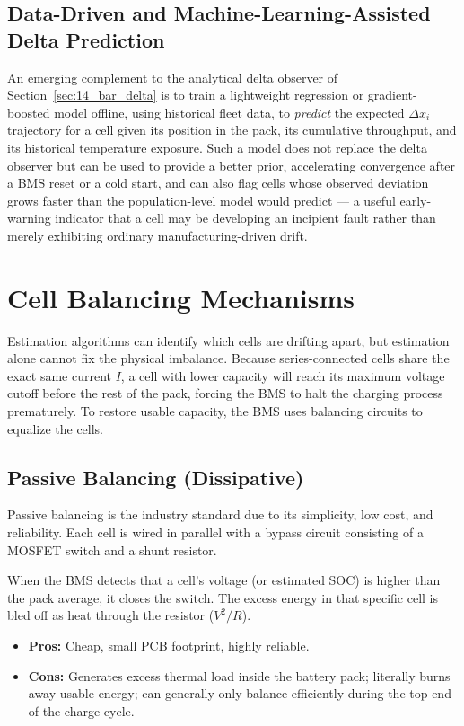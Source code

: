\subsection{Data-Driven and Machine-Learning-Assisted Delta Prediction}
\label{subsec:14_ml_delta}

An emerging complement to the analytical delta observer of Section~\ref{sec:14_bar_delta} is to train a lightweight regression or gradient-boosted model offline, using historical fleet data, to \emph{predict} the expected $\Delta x_i$ trajectory for a cell given its position in the pack, its cumulative throughput, and its historical temperature exposure. Such a model does not replace the delta observer but can be used to provide a better prior, accelerating convergence after a BMS reset or a cold start, and can also flag cells whose observed deviation grows faster than the population-level model would predict — a useful early-warning indicator that a cell may be developing an incipient fault rather than merely exhibiting ordinary manufacturing-driven drift.

\section{Cell Balancing Mechanisms}
\label{sec:14_balancing}

Estimation algorithms can identify which cells are drifting apart, but estimation alone cannot fix the physical imbalance. Because series-connected cells share the exact same current $I$, a cell with lower capacity will reach its maximum voltage cutoff before the rest of the pack, forcing the BMS to halt the charging process prematurely. To restore usable capacity, the BMS uses balancing circuits to equalize the cells.

\subsection{Passive Balancing (Dissipative)}
\label{subsec:14_passive}

Passive balancing is the industry standard due to its simplicity, low cost, and reliability. Each cell is wired in parallel with a bypass circuit consisting of a MOSFET switch and a shunt resistor.

When the BMS detects that a cell's voltage (or estimated SOC) is higher than the pack average, it closes the switch. The excess energy in that specific cell is bled off as heat through the resistor ($V^2/R$).
\begin{itemize}
    \item \textbf{Pros:} Cheap, small PCB footprint, highly reliable.
    \item \textbf{Cons:} Generates excess thermal load inside the battery pack; literally burns away usable energy; can generally only balance efficiently during the top-end of the charge cycle.
\end{itemize}

